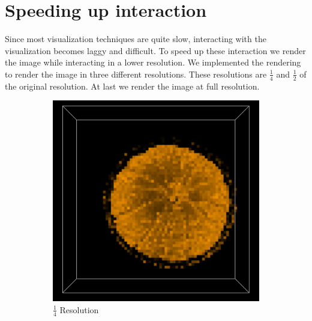 \documentclass[a4paper,twoside,11pt]{article}
\begin{document}
\section{Speeding up interaction}
Since most visualization techniques are quite slow, interacting with the visualization becomes laggy and difficult. To speed up these interaction we render the image while interacting in a lower resolution. We implemented the rendering to render the image in three different resolutions. These resolutions are $\frac{1}{4}$ and $\frac{1}{2}$ of the original resolution. At last we render the image at full resolution.

\begin{figure}[h!]
\begin{center}
        \begin{subfigure}[b]{0.3\textwidth}
                \includegraphics[width=\textwidth]{Images/res4.png}
                \caption{$\frac{1}{4}$ Resolution}
                \label{fig:res4}
        \end{subfigure}
        \begin{subfigure}[b]{0.3\textwidth}

\end{subfigure}
\end{center}
\end{figure}
\end{document}
